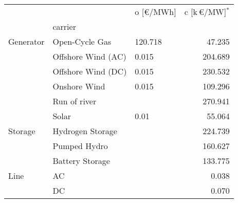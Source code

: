 \begin{tabular}{lllr}
\toprule
     &    & o [\euro/MWh] &  c [k\,\euro/MW]$^*$ \\
{} & carrier &               &                      \\
\midrule
Generator & Open-Cycle Gas &       120.718 &               47.235 \\
     & Offshore Wind (AC) &         0.015 &              204.689 \\
     & Offshore Wind (DC) &         0.015 &              230.532 \\
     & Onshore Wind &         0.015 &              109.296 \\
     & Run of river &               &              270.941 \\
     & Solar &          0.01 &               55.064 \\
Storage & Hydrogen Storage &               &              224.739 \\
     & Pumped Hydro &               &              160.627 \\
     & Battery Storage &               &              133.775 \\
Line & AC &               &                0.038 \\
     & DC &               &                0.070 \\
\bottomrule
\end{tabular}
